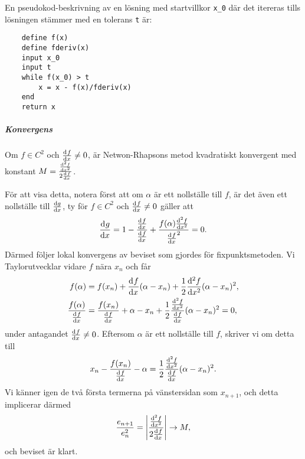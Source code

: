 En pseudokod-beskrivning av en lösning med startvillkor \verb|x_0| där det itereras tills lösningen stämmer med en tolerans \verb|t| är:
\begin{lstlisting}
	define f(x)
	define fderiv(x)
	input x_0
	input t
	while f(x_0) > t
		x = x - f(x)/fderiv(x)
	end
	return x
\end{lstlisting}

\subparagraph{Konvergens}
Om $f\in C^{2}$ och $\dv[]{f}{x} (\alpha) \neq 0$, är Netwon-Rhapsons metod kvadratiskt konvergent med konstant $M = \frac{\dv[2]{f}{x} (\alpha)}{2\dv[]{f}{x} (\alpha)}$.

För att visa detta, notera först att om $\alpha$ är ett nollställe till $f$, är det även ett nollställe till $\dv{g}{x}$, ty för $f\in C^{2}$ och $\dv[]{f}{x} (\alpha) \neq 0$ gäller att
\begin{align*}
	\dv[]{g}{x} (\alpha) = 1 - \frac{\dv[]{f}{x} (\alpha)}{\dv[]{f}{x} (\alpha)} + \frac{f(\alpha)\dv[2]{f}{x} (\alpha)}{\dv[]{f}{x} (\alpha)^{2}} = 0.
\end{align*}
Därmed följer lokal konvergens av beviset som gjordes för fixpunktsmetoden. Vi Taylorutvecklar vidare $f$ nära $x_{n}$ och får
\begin{align*}
	f(\alpha)                            &= f(x_{n}) + \dv[]{f}{x} (x_{n})(\alpha - x_{n}) + \frac{1}{2}\dv[2]{f}{x} (c_{n})(\alpha - x_{n})^{2}, \\
	\frac{f(\alpha)}{\dv[]{f}{x} (x_{n})} &= \frac{f(x_{n})}{\dv[]{f}{x} (x_{n})} + \alpha - x_{n} + \frac{1}{2}\frac{\dv[2]{f}{x} (c_{n})}{\dv[]{f}{x} (x_{n})}(\alpha - x_{n})^{2} = 0,
\end{align*}
under antagandet $\dv[]{f}{x} (x_{n}) \neq 0$. Eftersom $\alpha$ är ett nollställe till $f$, skriver vi om detta till
\begin{align*}
	x_{n} - \frac{f(x_{n})}{\dv[]{f}{x} (x_{n})} - \alpha = \frac{1}{2}\frac{\dv[2]{f}{x} (c_{n})}{\dv[]{f}{x} (x_{n})}(\alpha - x_{n})^{2}.
\end{align*}
Vi känner igen de två första termerna på vänstersidan som $x_{n + 1}$, och detta implicerar därmed
\begin{align*}
	\frac{e_{n + 1}}{e_{n}^{2}} = \abs{\frac{\dv[2]{f}{x} (c_{n})}{2\dv[]{f}{x} (x_{n})}} \to M,
\end{align*}
och beviset är klart.

